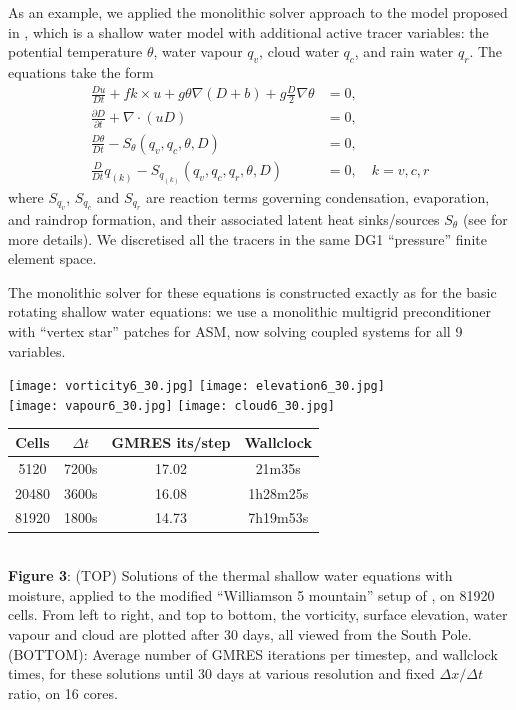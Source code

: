 \documentclass[
]{ImperialPoster}
\newcommand{\pp}[2]{\frac{\partial #1}{\partial #2}}
\newcommand{\DD}[2]{\frac{D #1}{D #2}}
\begin{document}
\begin{multicols}{3}
As an example, we applied the monolithic solver approach
to the model proposed in \cite{zerroukat2015moist}, which is a shallow
water model with additional active tracer variables: the potential
temperature $\theta$, water vapour $q_v$, cloud water $q_c$, and rain
water $q_r$. The equations take the form
\begin{align*}
  \DD{u}{t} + fk\times u + g\theta \nabla (D+b) + g\frac{D}{2}\nabla \theta
  & = 0, \\
  \pp{D}{t} + \nabla\cdot(uD) & = 0, \\
  \DD{\theta}{t} - S_\theta(q_v, q_c, \theta, D) & = 0, \\
  \DD{}{t}q_{(k)} - S_{q_{(k)}}(q_v, q_c, q_r, \theta, D) & = 0, \quad
  k=v,c,r
\end{align*}
where $S_{q_v}$, $S_{q_c}$ and $S_{q_r}$ are reaction terms governing
condensation, evaporation, and raindrop formation, and their associated
latent heat sinks/sources $S_\theta$ (see \cite{zerroukat2015moist}
for more details). We discretised all the tracers in the same DG1
``pressure'' finite element space.

The monolithic solver for these equations is constructed exactly as for
the basic rotating shallow water equations: we use a monolithic multigrid
preconditioner with ``vertex star'' patches for ASM, now solving coupled
systems for all 9 variables. 

\begin{center}
  \texttt{[image: vorticity6\_30.jpg]}
  \texttt{[image: elevation6\_30.jpg]}
  \\
  \texttt{[image: vapour6\_30.jpg]}
  \texttt{[image: cloud6\_30.jpg]}
  \\
  \begin{tabular}{cccc}
    Cells & $\Delta t$ & GMRES its/step & Wallclock \\
    \hline
    5120 & 7200s & 17.02 & 21m35s \\
    20480 & 3600s & 16.08 & 1h28m25s \\
    81920 & 1800s & 14.73 & 7h19m53s \\
  \end{tabular} \\
    \vspace{3mm} {\bfseries Figure 3}: (TOP) Solutions of the thermal
    shallow water equations with moisture, applied to the modified
    ``Williamson 5 mountain'' setup of \cite{zerroukat2015moist}, on
    81920 cells. From left to right, and top to bottom,
    the vorticity, surface elevation, water vapour and cloud are
    plotted after 30 days, all viewed from the South Pole.  (BOTTOM):
    Average number of GMRES iterations per timestep, and wallclock
    times, for these solutions until 30 days at various resolution and
    fixed $\Delta x/\Delta t$ ratio, on 16 cores.
  \end{center}


\end{multicols}
\end{document}
